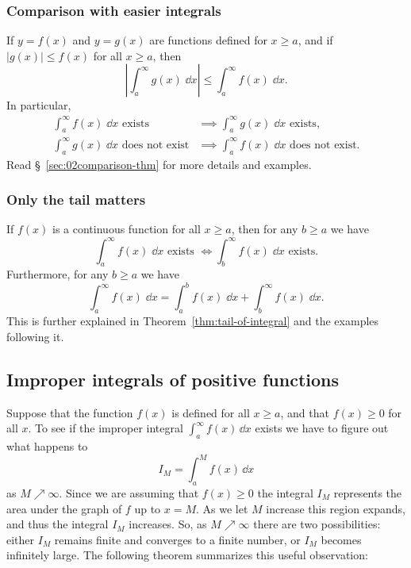 \subsubsection*{Comparison with easier integrals} If $y=f(x)$ and
$y=g(x)$ are functions defined for $x\geq a$, and if $|g(x)|\leq f(x)$
for all $x\geq a$, then
\[
\left|\int_a^\infty g(x) \;\dd x\right| \leq \int_a^\infty f(x) \;\dd
x.
\]
In particular,
\begin{align*}
  \int_a^\infty f(x)\;\dd x \text{ exists}&\implies
  \int_a^\infty g(x)\;\dd x \text{ exists,} \\
  \int_a^\infty g(x)\;\dd x \text{ does not exist}&\implies
  \int_a^\infty f(x)\;\dd x \text{ does not exist.}
\end{align*}
Read \S~\ref{sec:02comparison-thm} for more details and examples.

\subsubsection*{Only the tail matters} If $f(x)$ is a continuous
function for all $x\geq a$, then for any $b\geq a$ we have
\[
\int_a^\infty f(x)\;\dd x \text{ exists } \iff \int_b^\infty f(x)\;\dd
x \text{ exists.}
\]
Furthermore, for any $b\geq a$ we have
\begin{equation}
  \label{eq:integral-is-beginning-plus-tail}
  \int_a^\infty f(x)\;\dd x = \int_a^b f(x)\;\dd x +\int_b^\infty f(x)\;\dd x.
\end{equation}
This is further explained in Theorem~\ref{thm:tail-of-integral} and the examples
following it.

\subsection{Improper integrals of positive functions} %
\label{sec:improper-integral-of-positive-f}
Suppose that the function $f(x)$ is defined for all $x\geq a$, and that
$f(x)\geq 0$ for all $x$.  To see if the improper integral $\int_a^\infty
f(x)\,\dd x$ exists we have to figure out what happens to
\[
I_M = \int_a^M f(x)\,\dd x
\]
as $M\nearrow\infty$.  Since we are assuming that $f(x)\geq 0$ the
integral $I_M$ represents the area under the graph of $f$ up to $x=M$.
As we let $M$ increase this region expands, and thus the integral
$I_M$ increases.  So, as $M\nearrow\infty$ there are two
possibilities: either $I_M$ remains finite and converges to a finite
number, or $I_M$ becomes infinitely large.  The following theorem
summarizes this useful observation:

